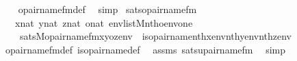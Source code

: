 \begin{isabellebody}
\ \ %
\endisadelimproof
%
\isatagproof
{}\isamarkupfalse%
\ opair{\isacharunderscore}{\kern0pt}name{\isacharunderscore}{\kern0pt}fm{\isacharunderscore}{\kern0pt}def\ \isamarkupfalse%
\ simp%
\endisatagproof
{\isafoldproof}%
%
\isadelimproof
\isanewline
%
\endisadelimproof
\isanewline
{}\isamarkupfalse%
\ sats{\isacharunderscore}{\kern0pt}opair{\isacharunderscore}{\kern0pt}name{\isacharunderscore}{\kern0pt}fm\ {\isacharcolon}{\kern0pt}\isanewline
\ \ \ {\isachardoublequoteopen}x{\isasymin}nat{\isachardoublequoteclose}\ {\isachardoublequoteopen}y{\isasymin}nat{\isachardoublequoteclose}\ {\isachardoublequoteopen}z{\isasymin}nat{\isachardoublequoteclose}\ {\isachardoublequoteopen}o{\isasymin}nat{\isachardoublequoteclose}\ {\isachardoublequoteopen}env{\isasymin}list{\isacharparenleft}{\kern0pt}M{\isacharparenright}{\kern0pt}{\isachardoublequoteclose}{\isachardoublequoteopen}nth{\isacharparenleft}{\kern0pt}o{\isacharcomma}{\kern0pt}env{\isacharparenright}{\kern0pt}{\isacharequal}{\kern0pt}one{\isachardoublequoteclose}\ \isanewline
\ \ \ \isanewline
\ \ \ \ {\isachardoublequoteopen}sats{\isacharparenleft}{\kern0pt}M{\isacharcomma}{\kern0pt}opair{\isacharunderscore}{\kern0pt}name{\isacharunderscore}{\kern0pt}fm{\isacharparenleft}{\kern0pt}x{\isacharcomma}{\kern0pt}y{\isacharcomma}{\kern0pt}o{\isacharcomma}{\kern0pt}z{\isacharparenright}{\kern0pt}{\isacharcomma}{\kern0pt}env{\isacharparenright}{\kern0pt}\ {\isasymlongleftrightarrow}\ is{\isacharunderscore}{\kern0pt}opair{\isacharunderscore}{\kern0pt}name{\isacharparenleft}{\kern0pt}nth{\isacharparenleft}{\kern0pt}x{\isacharcomma}{\kern0pt}env{\isacharparenright}{\kern0pt}{\isacharcomma}{\kern0pt}nth{\isacharparenleft}{\kern0pt}y{\isacharcomma}{\kern0pt}env{\isacharparenright}{\kern0pt}{\isacharcomma}{\kern0pt}nth{\isacharparenleft}{\kern0pt}z{\isacharcomma}{\kern0pt}env{\isacharparenright}{\kern0pt}{\isacharparenright}{\kern0pt}{\isachardoublequoteclose}\isanewline
%
\isadelimproof
\ \ %
\endisadelimproof
%
\isatagproof
{}\isamarkupfalse%
\ opair{\isacharunderscore}{\kern0pt}name{\isacharunderscore}{\kern0pt}fm{\isacharunderscore}{\kern0pt}def\ is{\isacharunderscore}{\kern0pt}opair{\isacharunderscore}{\kern0pt}name{\isacharunderscore}{\kern0pt}def\ \isamarkupfalse%
\ assms\ sats{\isacharunderscore}{\kern0pt}upair{\isacharunderscore}{\kern0pt}name{\isacharunderscore}{\kern0pt}fm\ \isamarkupfalse%
\ simp%
\endisatagproof
{\isafoldproof}%
%
\isadelimproof
\isanewline
%
\endisadelimproof

\end{isabellebody}
